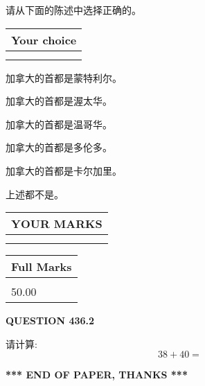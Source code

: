 \documentclass{ctexart}
\begin{document}
  
请从下面的陈述中选择正确的。
  
  
\noindent\hspace{3.0in} \begin{tabular}{|l|}
\hline
Your choice \\
\hline
 \\ 
 \\ 
\hline
\end{tabular}
  
  
 
 
加拿大的首都是蒙特利尔。
 
 
加拿大的首都是渥太华。
 
 
加拿大的首都是温哥华。
 
 
加拿大的首都是多伦多。
 
 
加拿大的首都是卡尔加里。
 
 
 上述都不是。
 
 
  
\vspace{0.2in}
  
\noindent\begin{tabular}{|l|}
\hline
 YOUR MARKS  \\
\hline
 \\ 
 \\ 
\hline
\end{tabular}
\hspace{0.05in} \begin{tabular}{|l|}
\hline
 Full Marks  \\
\hline
 \\ 
50.00 \\
\hline
\end{tabular}
{\textbf{\Large{QUESTION
436.2 
}}}
  
  
 
请计算:
\begin{equation}
38 +  %
40 = \nonumber
\end{equation}
 

 

 
   
   
 \vspace{0.2in}
 
   
   
   
   
\vspace{1.0in} 
{\textbf{\large{ *** END OF PAPER, THANKS *** }}} 
   
\end{document}
